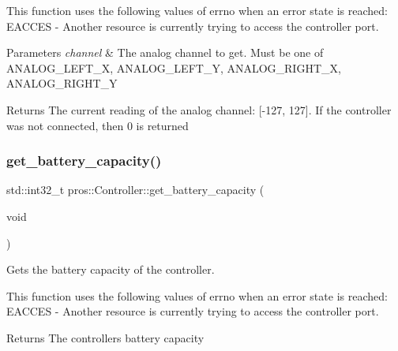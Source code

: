 This function uses the following values of errno when an error state is reached\+: E\+A\+C\+C\+ES -\/ Another resource is currently trying to access the controller port.


\begin{DoxyParams}{Parameters}
{\em channel} & The analog channel to get. Must be one of A\+N\+A\+L\+O\+G\+\_\+\+L\+E\+F\+T\+\_\+X, A\+N\+A\+L\+O\+G\+\_\+\+L\+E\+F\+T\+\_\+Y, A\+N\+A\+L\+O\+G\+\_\+\+R\+I\+G\+H\+T\+\_\+X, A\+N\+A\+L\+O\+G\+\_\+\+R\+I\+G\+H\+T\+\_\+Y\\
\hline
\end{DoxyParams}
\begin{DoxyReturn}{Returns}
The current reading of the analog channel\+: \mbox{[}-\/127, 127\mbox{]}. If the controller was not connected, then 0 is returned 
\end{DoxyReturn}
\mbox{\label{classpros_1_1Controller_a7d85ecacfd46161ddb2be08d856ca130}} 
\subsubsection{\texorpdfstring{get\+\_\+battery\+\_\+capacity()}{get\_battery\_capacity()}}
{\footnotesize\ttfamily std\+::int32\+\_\+t pros\+::\+Controller\+::get\+\_\+battery\+\_\+capacity (\begin{DoxyParamCaption}\item[{void}]{ }\end{DoxyParamCaption})}



Gets the battery capacity of the controller. 

This function uses the following values of errno when an error state is reached\+: E\+A\+C\+C\+ES -\/ Another resource is currently trying to access the controller port.

\begin{DoxyReturn}{Returns}
The controller\textquotesingle{}s battery capacity 
\end{DoxyReturn}
\mbox{\label{classpros_1_1Controller_a8fd8b131f13f2f7702b5299dab82fdaf}} 
